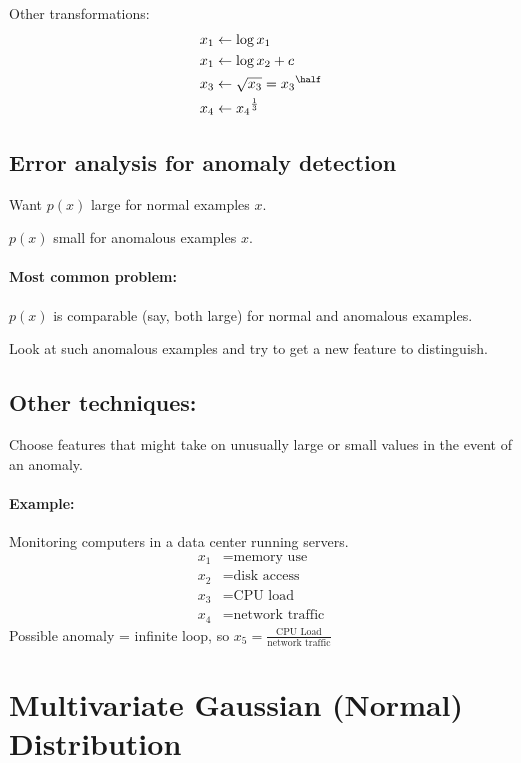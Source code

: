 Other transformations:
\begin{align*}
    x_1 & \gets \log{x_1}                  \\
    x_1 & \gets \log{x_2 + c}              \\
    x_3 & \gets \sqrt{x_3} = {x_3}^{\half} \\
    x_4 & \gets {x_4}^{\frac{1}{3}}        \\
\end{align*}

\subsection{Error analysis for anomaly detection}
Want $p(x)$ large for normal examples $x$.

$p(x)$ small for anomalous examples $x$.

\paragraph{Most common problem:}
$p(x)$ is comparable (say, both large) for normal and anomalous examples.

Look at such anomalous examples and try to get a new feature to distinguish.

\subsection{Other techniques:}
Choose features that might take on unusually large or small values in the
event of an anomaly.

\paragraph{Example:} Monitoring computers in a data center running servers.
\begin{align*}
    x_1 & = \text{memory use}      \\
    x_2 & = \text{disk access}     \\
    x_3 & = \text{CPU load}        \\
    x_4 & = \text{network traffic}
\end{align*}
Possible anomaly = infinite loop, so $x_5 = \frac{\text{CPU Load}}{\text{network traffic}}$

\section{Multivariate Gaussian (Normal) Distribution}
